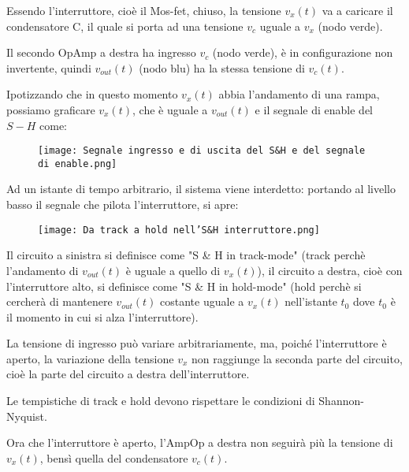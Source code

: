Essendo l'interruttore, cioè il Mos-fet, chiuso, la tensione $v_{x} (t)$ va a caricare il condensatore C, 
il quale si porta ad una tensione $v_c$ uguale a $v_x$ (nodo verde). \newline 

Il secondo OpAmp a destra ha ingresso $v_c$ (nodo verde), è in configurazione non invertente, 
quindi $v_{out} (t)$ (nodo blu) ha la stessa tensione di $v_c (t)$. \newline 

Ipotizzando che in questo momento $v_x(t)$ abbia l'andamento di una rampa, possiamo graficare $v_x (t)$, che è uguale a $v_{out} (t)$ 
e il segnale di enable del $S-H$ come: 

\begin{figure}[h]
    \centering
    \texttt{[image: Segnale ingresso e di uscita del S\&H e del segnale di enable.png]}
\end{figure}

Ad un istante di tempo arbitrario, il sistema viene interdetto: 
portando al livello basso il segnale che pilota l'interruttore, si apre:  

\begin{figure}[h]
    \centering
    \texttt{[image: Da track a hold nell'S\&H interruttore.png]}
\end{figure}

Il circuito a sinistra si definisce come "S \& H in track-mode" (track perchè l'andamento di $v_{out} (t)$ è uguale a quello di $v_x (t)$), 
il circuito a destra, cioè con l'interruttore alto, si definisce come "S \& H in hold-mode" (hold perchè si cercherà di mantenere $v_{out} (t)$ costante uguale a $v_x (t)$ nell'istante $t_0$ 
dove $t_0$ è il momento in cui si alza l'interruttore). \newline 

La tensione di ingresso può variare arbitrariamente, ma, poiché l'interruttore è aperto, 
la variazione della tensione $v_x$ non raggiunge la seconda parte del circuito, 
cioè la parte del circuito a destra dell'interruttore. \newline 

Le tempistiche di track e hold devono rispettare le condizioni di Shannon-Nyquist. \newline 

Ora che l'interruttore è aperto, l'AmpOp a destra non seguirà più la tensione di $v_x (t)$, 
bensì quella del condensatore $v_c (t)$. \newline 

